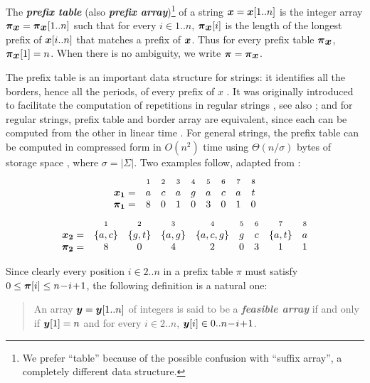 \documentclass[runningheads,a4paper]{llncs}
\def\s#1{\mbox{\boldmath $#1$}}
\def\+{\!+\!}
\def\-{\!-\!}
\def\itbf#1{\textit{\textbf{#1}}}
\begin{document}
\begin{definition}
\label{defn-prefix}
The \itbf{prefix table} (also \itbf{prefix array})\footnote{
We prefer ``table'' because of the possible confusion with ``suffix array'',
a completely different data structure.}
of a string $\s{x} = \s{x}[1..n]$ is the integer array
$\s{\pi}_{\s{x}} = \s{\pi}_{\s{x}}[1..n]$
such that for every $i \in 1..n$, $\s{\pi}_{\s{x}}[i]$ is the
length of the longest prefix of $\s{x}[i..n]$ that matches a prefix of $\s{x}$.
Thus for every prefix table $\s{\pi}_{\s{x}}$, $\s{\pi}_{\s{x}}[1] = n$.
When there is no ambiguity, we write $\s{\pi} = \s{\pi}_{\s{x}}$.
\end{definition}
The prefix table is an important data structure for strings:
it identifies all the borders, hence all the periods,
of every prefix of \s{x} \cite{CRSW13}.
It was originally introduced to facilitate the computation of
repetitions in regular strings \cite{ML84}, see also \cite{S03};
and for regular strings, prefix table and border array are equivalent,
since each can be computed from the other in linear time \cite{BKS13}.
For general strings, the prefix table can be computed in compressed form in $O(n^2)$ time
using $\Theta(n/\sigma)$ bytes of storage space \cite{SW08},
where $\sigma = |\Sigma|$.
Two examples follow, adapted from \cite{CRSW13}:
\begin{equation}
\label{pi1}
\begin{array}{rcccccccc}
& \scriptstyle 1 & \scriptstyle 2 & \scriptstyle 3 & \scriptstyle 4 & \scriptstyle 5 & \scriptstyle  6 & \scriptstyle 7 & \scriptstyle 8 \\
\s{x_1} = & a & c & a & g & a & c & a & t \\
\s{\pi_1} = & 8 & 0 & 1 & 0 & 3 & 0 & 1 & 0
\end{array}
\end{equation}
\begin{equation}
\label{pi2}
\begin{array}{rcccccccc}
& \scriptstyle 1 & \scriptstyle 2 & \scriptstyle 3 & \scriptstyle 4 & \scriptstyle 5 & \scriptstyle  6 & \scriptstyle 7 & \scriptstyle 8 \\
\s{x_2} = & \{a,c\} & \{g,t\} & \{a,g\} & \{a,c,g\} & g & c & \{a,t\} & a \\
\s{\pi_2} = & 8 & 0 & 4 & 2 & 0 & 3 & 1 & 1
\end{array}
\end{equation}

Since clearly every position $i \in 2..n$ in a prefix table \s{\pi}
must satisfy $0 \le \s{\pi}[i] \le n\- i\+ 1$, the following definition is a natural one:
\begin{quote}
An array $\s{y} = \s{y}[1..n]$ of integers is said to be a \itbf{feasible array}
if and only if $\s{y}[1] = n$ and for every $i \in 2..n$,
$\s{y}[i] \in 0..n\- i\+ 1$.
\end{quote}
\end{document}
